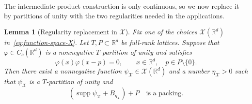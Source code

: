 \documentclass[11pt,reqno]{amsart}
\numberwithin{equation}{section}
\newtheorem{lemma}[theorem]{Lemma}
\theoremstyle{definition}
\theoremstyle{remark}
\newcommand{\R}{\mathbb R}
\newcommand{\supp}{\operatorname{supp}}
\begin{document}
The intermediate product construction is only continuous, so we now replace it by
partitions of unity with the two regularities needed in the applications.

\begin{lemma}[Regularity replacement in $\mathcal X$]
\label{lem:pou-replacement}
Fix one of the choices $\mathcal X(\R^d)$ in~\eqref{eq:function-space-X}.
Let $T,P\subset\R^d$ be full-rank lattices.  Suppose that
$\varphi\in C_c(\R^d)$ is a nonnegative $T$-partition of unity and satisfies
\begin{equation}\label{eq:replacement-input-separation}
 \varphi(x)\varphi(x-p)=0,
 \qquad x\in\R^d,\quad p\in P\setminus\{0\}.
\end{equation}
Then there exist a nonnegative function
$\psi_{\mathcal X}\in\mathcal X(\R^d)$ and a number
$\eta_{\mathcal X}>0$ such that $\psi_{\mathcal X}$ is a
$T$-partition of unity and
\begin{equation}\label{eq:replacement-output-buffer}
 (\supp\psi_{\mathcal X}+B_{\eta_{\mathcal X}})+P
 \quad\text{is a packing.}
\end{equation}
\end{lemma}
\end{document}
